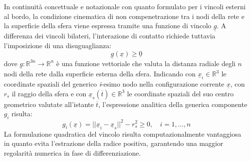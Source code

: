 In continuità concettuale e notazionale con quanto formulato per i vincoli esterni al bordo, la condizione cinematica di non compenetrazione tra i nodi della rete e la superficie della sfera viene espressa tramite una funzione di vincolo $\underline{g}$. A differenza dei vincoli bilateri, l'interazione di contatto richiede tuttavia l'imposizione di una disuguaglianza: 
\begin{equation}
  \underline{g}(\underline{x}) \geq \underline{0}
\end{equation}
dove $\underline{g} : \mathbb{R}^{3n} \to \mathbb{R}^n$ è una funzione vettoriale che valuta la distanza radiale degli $n$ nodi della rete dalla superficie esterna della sfera. Indicando con $\underline{x}_i \in \mathbb{R}^3$ le coordinate spaziali del generico \textit{i}-esimo nodo nella configurazione corrente $\underline{x}$, con $r_s$ il raggio della sfera e con $\underline{x}_s(\overline{t}) \in \mathbb{R}^{3}$ le coordinate spaziali del suo centro geometrico valutate all'istante $\overline{t}$, l'espressione analitica della generica componente $g_i$ risulta: 
\begin{equation}
  g_i(\underline{x}) = || \underline{x}_i - \underline{x}_s||^2 - r_s^2 \geq 0, \quad i = 1, \dots, n
  \label{eq:gap_quadratico}
\end{equation}
La formulazione quadratica del vincolo risulta computazionalmente vantaggiosa in quanto evita l'estrazione della radice positiva, garantendo una maggior regolarità numerica in fase di differenziazione. 

